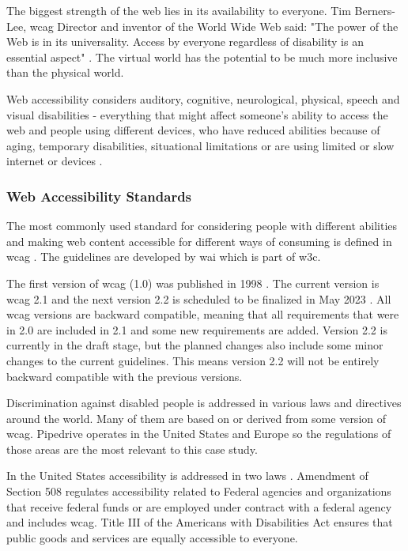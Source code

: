 \documentclass{master_thesis}
\begin{document}
The biggest strength of the web lies in its availability to everyone. Tim Berners-Lee, \ac{wcag} Director and inventor of the World Wide Web said: "The power of the Web is in its universality. Access by everyone regardless of disability is an essential aspect" \citep{WWWC1997}. The virtual world has the potential to be much more inclusive than the physical world.

Web accessibility considers auditory, cognitive, neurological, physical, speech and visual disabilities - everything that might affect someone's ability to access the web and people using different devices, who have reduced abilities because of aging, temporary disabilities, situational limitations or are using limited or slow internet or devices \citep{Henry2022}.

\subsubsection{Web Accessibility Standards}

The most commonly used standard for considering people with different abilities and making web content accessible for different ways of consuming is defined in \ac{wcag} \citep{Kirkpatrick2018}. The guidelines are developed by \ac{wai} which is part of \ac{w3c}.

The first version of \ac{wcag} (1.0) was published in 1998 \citep{Vanderheiden1998}. The current version is \ac{wcag} 2.1 and the next version 2.2 is scheduled to be finalized in May 2023 \citep{Henry2023}. All \ac{wcag} versions are backward compatible, meaning that all requirements that were in 2.0 are included in 2.1 and some new requirements are added. Version 2.2 is currently in the draft stage, but the planned changes also include some minor changes to the current guidelines. This means version 2.2 will not be entirely backward compatible with the previous versions.

Discrimination against disabled people is addressed in various laws and directives around the world. Many of them are based on or derived from some version of \ac{wcag}. Pipedrive operates in the United States and Europe so the regulations of those areas are the most relevant to this case study.

In the United States accessibility is addressed in two laws \citep{Siteimprove}. Amendment of Section 508 regulates accessibility related to Federal agencies and organizations that receive federal funds or are employed under contract with a federal agency and includes \ac{wcag}. Title III of the Americans with Disabilities Act ensures that public goods and services are equally accessible to everyone.
\end{document}
